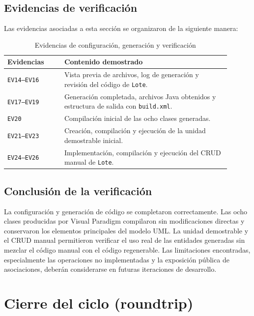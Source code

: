 \documentclass[11pt,a4paper]{article}
\begin{document}
\subsection{Evidencias de verificación}

Las evidencias asociadas a esta sección se organizaron de la siguiente manera:

\begin{table}[htbp]
\centering
\small
\caption{Evidencias de configuración, generación y verificación}
\begin{tabular}{|p{0.23\linewidth}|p{0.67\linewidth}|}
\hline
\textbf{Evidencias} & \textbf{Contenido demostrado} \\
\hline
\texttt{EV14--EV16} & Vista previa de archivos, log de generación y revisión del código de \texttt{Lote}. \\
\hline
\texttt{EV17--EV19} & Generación completada, archivos Java obtenidos y estructura de salida con \texttt{build.xml}. \\
\hline
\texttt{EV20} & Compilación inicial de las ocho clases generadas. \\
\hline
\texttt{EV21--EV23} & Creación, compilación y ejecución de la unidad demostrable inicial. \\
\hline
\texttt{EV24--EV26} & Implementación, compilación y ejecución del CRUD manual de \texttt{Lote}. \\
\hline
\end{tabular}
\end{table}

\subsection{Conclusión de la verificación}

La configuración y generación de código se completaron correctamente. Las ocho clases producidas por Visual Paradigm compilaron sin modificaciones directas y conservaron los elementos principales del modelo UML. La unidad demostrable y el CRUD manual permitieron verificar el uso real de las entidades generadas sin mezclar el código manual con el código regenerable. Las limitaciones encontradas, especialmente las operaciones no implementadas y la exposición pública de asociaciones, deberán considerarse en futuras iteraciones de desarrollo.

\section{Cierre del ciclo (roundtrip)}
\end{document}

